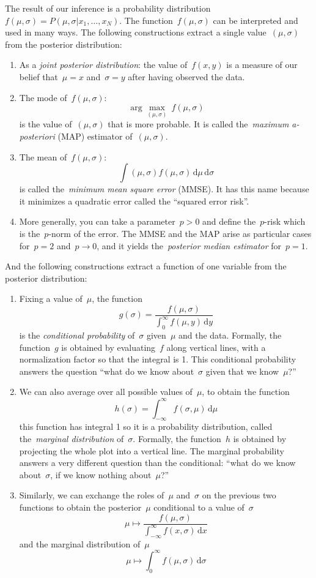 \bigskip

The result of our inference is a probability
distribution~$f(\mu,\sigma)=P(\mu,\sigma|x_1,\ldots,x_N)$.  The
function~$f(\mu,\sigma)$ can be interpreted and used in many ways.  The
following constructions extract a single value~$(\mu,\sigma)$ from
the posterior distribution:

\begin{enumerate}
	\item As a \emph{joint posterior  distribution}: the value
		of~$f(x,y)$ is a measure of our belief that~$\mu=x$
		and~$\sigma=y$ after having observed the data.
	\item The mode of~$f(\mu,\sigma)$:
		$$
		\arg\max_{(\mu,\sigma)}\ f(\mu,\sigma)
		$$
		is the value of~$(\mu,\sigma)$ that is more probable.
		It is called the~\emph{maximum a-posteriori} (MAP) estimator
		of~$(\mu,\sigma)$.
	\item The mean of~$f(\mu,\sigma)$:
		$$
		\int (\mu,\sigma)f(\mu,\sigma)
		\,\mathrm{d}\mu
		\,\mathrm{d}\sigma
		$$
		is called the~\emph{minimum mean square error} (MMSE).
		It has this name because it minimizes a quadratic error
		called the ``squared error risk''.
	\item More generally, you can take a parameter~$p>0$ and define
		the~$p$-risk which is the~$p$-norm of the error.  The MMSE
		and the MAP arise as particular cases for~$p=2$ and~$p\to0$,
		and it yields the~\emph{posterior median estimator}
		for~$p=1$.
\end{enumerate}

And the following constructions extract a function of one variable from the
posterior distribution:

\begin{enumerate}
	\item Fixing a value of~$\mu$, the function
		$$
		g(\sigma)=\frac{f(\mu,\sigma)}{\int_0^\infty
		f(\mu,y)\,\mathrm{d}y}
		$$
		is the \emph{conditional probability} of~$\sigma$ given~$\mu$
		and the data.  Formally, the function~$g$ is obtained by
		evaluating~$f$ along vertical lines, with a normalization
		factor so that the integral is 1.
		This conditional probability answers the question ``what do
		we know about~$\sigma$ given that we know~$\mu$?''
	\item We can also average over all possible values of~$\mu$, to
		obtain the function
		$$
		h(\sigma)=\int_{-\infty}^\infty
		f(\sigma,\mu)\,\mathrm{d}\mu
		$$
		this function has integral 1 so it is a probability
		distribution, called the~\emph{marginal distribution}
		of~$\sigma$.  Formally, the function~$h$ is obtained by
		projecting the whole plot into a vertical line.
		The marginal probability answers a very different question
		than the conditional: ``what do we know about~$\sigma$, if we
		know nothing about~$\mu$?''
	\item Similarly, we can exchange the roles of~$\mu$ and~$\sigma$ on
		the previous two functions to obtain the posterior~$\mu$
		conditional to a value of~$\sigma$
		$$
		\mu\mapsto\frac{f(\mu,\sigma)}{\int_{-\infty}^\infty
		f(x,\sigma)\,\mathrm{d}x}
		$$
		and the marginal distribution of~$\mu$
		$$
		\mu\mapsto\int_0^\infty
		f(\mu,\sigma)\,\mathrm{d}\sigma
		$$
\end{enumerate}

